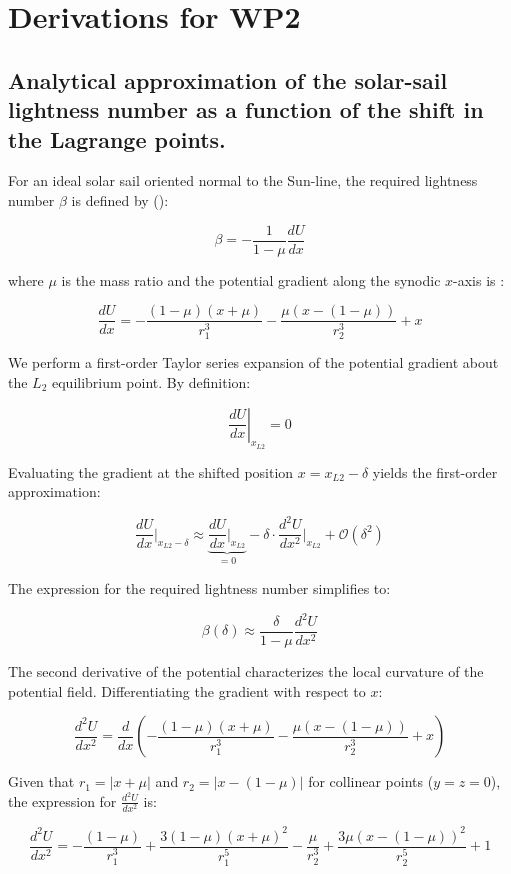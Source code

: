 \chapter{Derivations for WP2}
\label{chapter:derivations-wp2}

\section{Analytical approximation of the solar-sail lightness number as a function of the shift in the Lagrange points.} \label{sec:beta-analytical}

For an ideal solar sail oriented normal to the Sun-line, the required lightness number $\beta$ is defined by (\parencite{mcinnes1999book}):

$$ \beta = - \frac{1}{1-\mu} \frac{dU}{dx} $$

where $\mu$ is the mass ratio and the potential gradient along the synodic $x$-axis is \parencite{mcinnes1999book}:

$$ \frac{dU}{dx} = -\frac{(1-\mu)(x+\mu)}{r_1^3} - \frac{\mu(x-(1-\mu))}{r_2^3} + x $$

We perform a first-order Taylor series expansion of the potential gradient about the $L_2$ equilibrium point. By definition:

$$ \left. \frac{dU}{dx} \right|_{x_{L2}} = 0 $$

Evaluating the gradient at the shifted position $x = x_{L2} - \delta$ yields the first-order approximation:

$$ \frac{dU}{dx}\bigg|_{x_{L2} - \delta} \approx \underbrace{\frac{dU}{dx}\bigg|_{x_{L2}}}_{=0} - \delta \cdot \frac{d^2U}{dx^2}\bigg|_{x_{L2}} + \mathcal{O}(\delta^2) $$

The expression for the required lightness number simplifies to:

$$ \beta(\delta) \approx \frac{\delta}{1-\mu} \frac{d^2U}{dx^2} $$

The second derivative of the potential characterizes the local curvature of the potential field. Differentiating the gradient with respect to $x$:

$$ \frac{d^2U}{dx^2} = \frac{d}{dx} \left( -\frac{(1-\mu)(x+\mu)}{r_1^3} - \frac{\mu(x-(1-\mu))}{r_2^3} + x \right) $$

Given that $r_1 = |x + \mu|$ and $r_2 = |x - (1-\mu)|$ for collinear points ($y=z=0$), the expression for $\frac{d^2U}{dx^2}$ is:

$$ \frac{d^2U}{dx^2} = -\frac{(1-\mu)}{r_1^3} + \frac{3(1-\mu)(x+\mu)^2}{r_1^5} - \frac{\mu}{r_2^3} + \frac{3\mu(x-(1-\mu))^2}{r_2^5} + 1 $$

